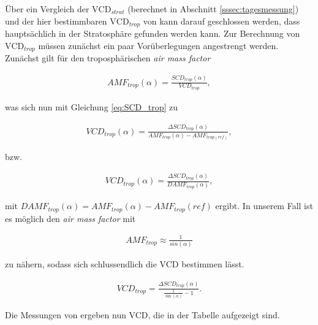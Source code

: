 \documentclass[12pt, a4paper, bibliography=totoc]{scrartcl}
\begin{document}
\begin{multicols}{2}
Über ein Vergleich der $\text{VCD}_{strat}$ (berechnet in Abschnitt \ref{sssec:tagesmessung})
und der hier bestimmbaren $\text{VCD}_{trop}$  von  kann darauf geschlossen werden, dass  hauptsächlich in der Stratosphäre gefunden werden kann.
Zur Berechnung von $\text{VCD}_{trop}$ müssen zunächst ein paar Vorüberlegungen angestrengt werden.
Zunächst gilt für den troposphärischen \textit{air mass factor}

\begin{align}
AMF_{trop}(\alpha) = \frac{SCD_{trop}(\alpha)}{VCD_{trop}},
\end{align}

was sich nun mit Gleichung \ref{eq:SCD_trop} zu 

\begin{align}
VCD_{trop}(\alpha) = \frac{\Delta SCD_{trop}(\alpha)}{AMF_{trop}(\alpha)-AMF_{trop(ref)}}, 
\end{align} 

bzw.

\begin{align}
VCD_{trop}(\alpha) = \frac{\Delta SCD_{trop}(\alpha)}{DAMF_{trop}(\alpha)}, 
\end{align}  

mit $DAMF_{trop}(\alpha) = AMF_{trop}(\alpha)-AMF_{trop}(ref)$ ergibt.
In unserem Fall ist es möglich den \textit{air mass factor} mit

\begin{align}
AMF_{trop} \approx \frac{1}{sin(\alpha)}
\end{align}

zu nähern, sodass sich schlussendlich die VCD bestimmen lässt.

\begin{align}
VCD_{trop} = \frac{\Delta SCD_{trop}(\alpha)}{\frac{1}{\sin(\alpha)}-1}.
\end{align}

Die Messungen von  ergeben nun VCD, die in der Tabelle aufgezeigt sind.

\begin{center}
	

\end{center}
\end{multicols}
\end{document}
